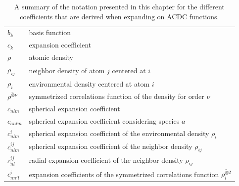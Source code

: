 \def\arraystretch{1.5}
\begin{table}[bthp]
\centering
\begin{tabular}{ll}
  $b_k$ & basis function \\
  $c_k$ & expansion coefficient \\
  $\rho$ & atomic density \\ 
  $\rho_{ij}$ & neighbor density of atom $j$ centered at $i$ \\ 
  $\rho_i$ & environmental density centered at atom $i$ \\ 
  $\overline{\rho^{\otimes \nu}}$ & symmetrized correlations function of the density for order $\nu$ \\
  $c_{nlm}$ & spherical expansion coefficient \\
  $c_{anlm}$ & spherical expansion coefficient considering species $a$ \\
  $c^i_{nlm}$ & spherical expansion coefficient of the environmental density $\rho_i$ \\
  $c^{ij}_{nlm}$ & spherical expansion coefficient of the neighbor density $\rho_{ij}$ \\
  $c^{ij}_{nl}$ & radial expansion coefficient of the neighbor density $\rho_{ij}$ \\
  $c^i_{nn'l}$ & expansion coefficients of the symmetrized correlations function $\overline{\rho_i^{\otimes 2}}$ \\
\end{tabular}
\caption{A summary of the notation presented in this chapter for the different coefficients that are derived when expanding on ACDC functions.}
\label{table:coefficients}
\end{table}
\def\arraystretch{1}





